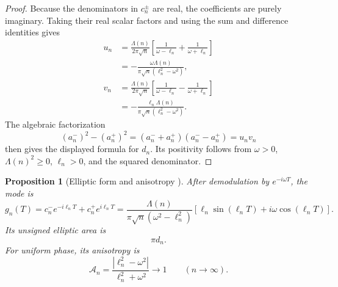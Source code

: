 \documentclass[11pt]{amsart}
\numberwithin{equation}{section}
\theoremstyle{plain}
\newtheorem{proposition}[theorem]{Proposition}
\theoremstyle{definition}
\theoremstyle{remark}
\newcommand{\1}{\mathbf{1}}
\begin{document}
\begin{proof}
Because the denominators in \(c_n^\pm\) are real, the coefficients are
purely imaginary.  Taking their real scalar factors and using the sum and
difference identities gives
\begin{align}
u_n
&=
\frac{\Lambda(n)}{2\pi\sqrt n}
\left[
\frac1{\omega-\ell_n}+\frac1{\omega+\ell_n}
\right]
\label{eq:un_proof_one}
\\
&=
-\frac{\omega\Lambda(n)}
{\pi\sqrt n(\ell_n^2-\omega^2)},
\label{eq:un_proof_two}
\\
v_n
&=
\frac{\Lambda(n)}{2\pi\sqrt n}
\left[
\frac1{\omega-\ell_n}-\frac1{\omega+\ell_n}
\right]
\label{eq:vn_proof_one}
\\
&=
-\frac{\ell_n\Lambda(n)}
{\pi\sqrt n(\ell_n^2-\omega^2)}.
\label{eq:vn_proof_two}
\end{align}
The algebraic factorization
\begin{equation}
(a_n^-)^2-(a_n^+)^2
=
(a_n^-+a_n^+)(a_n^--a_n^+)
=u_nv_n
\label{eq:dn_difference_squares}
\end{equation}
then gives the displayed formula for \(d_n\).  Its positivity follows
from \(\omega>0\), \(\Lambda(n)^2\geq0\), \(\ell_n>0\), and the squared
denominator.
\end{proof}


\begin{proposition}[Elliptic form and anisotropy {}]
\label{prop:ellipse_anisotropy}
After demodulation by \(e^{-i\omega T}\), the mode is
\begin{equation}
g_n(T)
=
c_n^-e^{-i\ell_nT}
+
c_n^+e^{i\ell_nT}
=
\frac{\Lambda(n)}
{\pi\sqrt n(\omega^2-\ell_n^2)}
\left[
\ell_n\sin(\ell_nT)
+
i\omega\cos(\ell_nT)
\right].
\label{eq:gn_ellipse}
\end{equation}
Its unsigned elliptic area is
\begin{equation}
\pi d_n.
\label{eq:ellipse_area}
\end{equation}
For uniform phase, its anisotropy is
\begin{equation}
\mathcal A_n
=
\frac{|\ell_n^2-\omega^2|}{\ell_n^2+\omega^2}
\longrightarrow1
\qquad(n\to\infty).
\label{eq:single_mode_anisotropy}
\end{equation}
\end{proposition}
\end{document}
